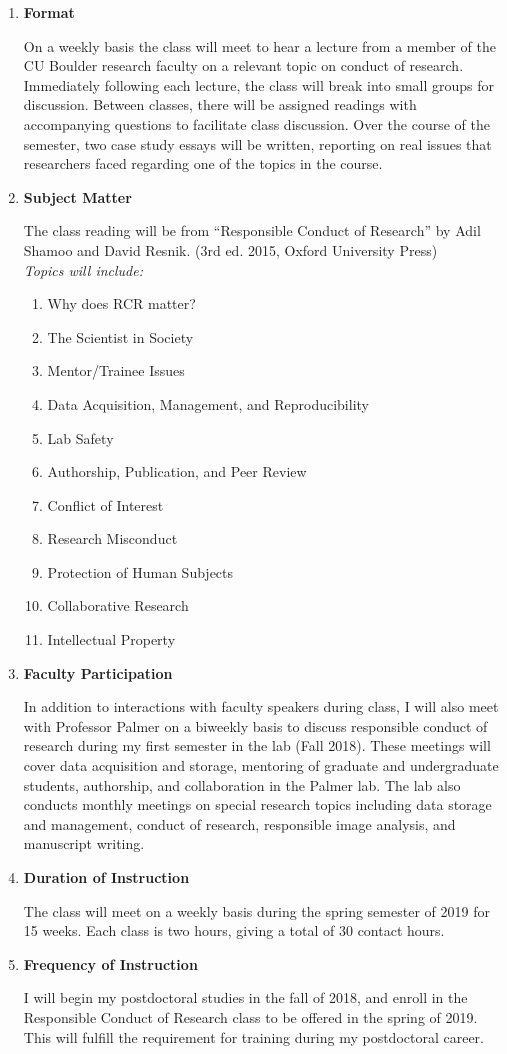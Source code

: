 \documentclass{F32}
\begin{document}
\begin{enumerate}
  \item{\bf Format}

  On a weekly basis the class will meet to hear a lecture from a member of the CU Boulder research faculty on a relevant topic on conduct of research. Immediately following each lecture, the class will break into small groups for discussion. Between classes, there will be assigned readings with accompanying questions to facilitate class discussion. Over the course of the semester, two case study essays will be written, reporting on real issues that researchers faced regarding one of the topics in the course.
  \item{\bf Subject Matter}

  The class reading will be from ``Responsible Conduct of Research'' by Adil Shamoo and David Resnik. (3rd ed. 2015, Oxford University Press)\\

  \textit{Topics will include:}
  \begin{enumerate}
  \item{Why does RCR matter?}
  \item{The Scientist in Society}
  \item{Mentor/Trainee Issues}
  \item{Data Acquisition, Management, and Reproducibility}
  \item{Lab Safety}
  \item{Authorship, Publication, and Peer Review}
  \item{Conflict of Interest}
  \item{Research Misconduct}
  \item{Protection of Human Subjects}
  \item{Collaborative Research}
  \item{Intellectual Property}
  \end{enumerate}
  \item{\bf Faculty Participation}

  In addition to interactions with faculty speakers during class, I will also meet with Professor Palmer on a biweekly basis to discuss responsible conduct of research during my first semester in the lab (Fall 2018). These meetings will cover data acquisition and storage, mentoring of graduate and undergraduate students, authorship, and collaboration in the Palmer lab. The lab also conducts monthly meetings on special research topics including data storage and management, conduct of research, responsible image analysis, and manuscript writing.
  \item{\bf Duration of Instruction}

  The class will meet on a weekly basis during the spring semester of 2019 for 15 weeks. Each class is two hours, giving a total of 30 contact hours.
  \item{\bf Frequency of Instruction}

  I will begin my postdoctoral studies in the fall of 2018, and enroll in the Responsible Conduct of Research class to be offered in the spring of 2019. This will fulfill the requirement for training during my postdoctoral career.
\end{enumerate}
\end{document}
